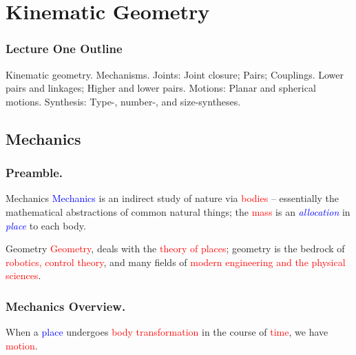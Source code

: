 \section{Kinematic Geometry}

\begin{frame}
	\frametitle{Lecture One Outline}
	\begin{tcolorbox}[coltitle=white!80,colframe=blue!85,split=.2,title=Mechanism Components]
		Kinematic geometry. Mechanisms.
		\tcblower
		Joints: Joint closure; Pairs; Couplings.
		\vspace{.2cm}
		\newline
		Lower pairs and linkages; Higher and lower pairs.
		\vspace{.2cm}
		\newline
		Motions: Planar and spherical motions.
		\vspace{.2cm}
		\newline
		Synthesis: Type-, number-, and size-syntheses.
	\end{tcolorbox}
\end{frame}

\subsection{Mechanics}
\begin{frame}
	\frametitle{Preamble.}
	\begin{block}{Mechanics}
		\textcolor{blue}{Mechanics} is an indirect study of nature via \textcolor{red}{bodies} --  essentially the mathematical abstractions of common natural things; the \textcolor{red}{mass} is an \textcolor{blue}{\textit{allocation}} in \textcolor{blue}{\textit{place}} to each body.
	\end{block}

	\begin{block}{Geometry}
		 \textcolor{red}{Geometry}, deals with the \textcolor{red}{theory of places}; geometry is the bedrock of \textcolor{red}{robotics, control theory}, and many fields of \textcolor{red}{modern engineering and the physical sciences}.
\end{block}
\end{frame}

\begin{frame}
	\frametitle{Mechanics Overview.}
	\begin{definition}[Motion]
		When a  \textcolor{blue}{place} undergoes \textcolor{red}{body transformation} in the course of  \textcolor{red}{time}, we have \textcolor{red}{motion}.
	\end{definition}
\end{frame}

